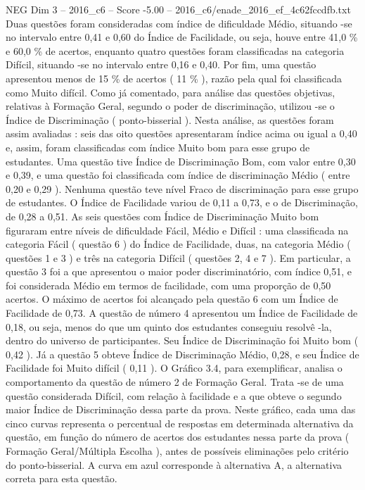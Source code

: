 \begin{textsample}{NEG Dim 3 – 2016\_c6 – Score -5.00 – 2016\_c6/enade\_2016\_ef\_4c62fccdfb.txt}
Duas questões foram consideradas com índice de dificuldade Médio, situando -se no intervalo entre 0,41 e 0,60 do Índice de Facilidade, ou seja, houve entre 41,0 \% e 60,0 \% de acertos, enquanto quatro questões foram classificadas na categoria Difícil, situando -se no intervalo entre 0,16 e 0,40.
Por fim, uma questão apresentou menos de 15 \% de acertos ( 11 \% ), razão pela qual foi classificada como Muito difícil.
Como já comentado, para análise das questões objetivas, relativas à Formação Geral, segundo o poder de discriminação, utilizou -se o Índice de Discriminação ( ponto-bisserial ).
Nesta análise, as questões foram assim avaliadas : seis das oito questões apresentaram índice acima ou igual a 0,40 e, assim, foram classificadas com índice Muito bom para esse grupo de estudantes.
Uma questão tive Índice de Discriminação Bom, com valor entre 0,30 e 0,39, e uma questão foi classificada com índice de discriminação Médio ( entre 0,20 e 0,29 ).
Nenhuma questão teve nível Fraco de discriminação para esse grupo de estudantes.
O Índice de Facilidade variou de 0,11 a 0,73, e o de Discriminação, de 0,28 a 0,51.
As seis questões com Índice de Discriminação Muito bom figuraram entre níveis de dificuldade Fácil, Médio e Difícil : uma classificada na categoria Fácil ( questão 6 ) do Índice de Facilidade, duas, na categoria Médio ( questões 1 e 3 ) e três na categoria Difícil ( questões 2, 4 e 7 ).
Em particular, a questão 3 foi a que apresentou o maior poder discriminatório, com índice 0,51, e foi considerada Médio em termos de facilidade, com uma proporção de 0,50 acertos.
O máximo de acertos foi alcançado pela questão 6 com um Índice de Facilidade de 0,73.
A questão de número 4 apresentou um Índice de Facilidade de 0,18, ou seja, menos do que um quinto dos estudantes conseguiu resolvê -la, dentro do universo de participantes.
Seu Índice de Discriminação foi Muito bom ( 0,42 ).
Já a questão 5 obteve Índice de Discriminação Médio, 0,28, e seu Índice de Facilidade foi Muito difícil ( 0,11 ).
O Gráfico 3.4, para exemplificar, analisa o comportamento da questão de número 2 de Formação Geral.
Trata -se de uma questão considerada Difícil, com relação à facilidade e a que obteve o segundo maior Índice de Discriminação dessa parte da prova.
Neste gráfico, cada uma das cinco curvas representa o percentual de respostas em determinada alternativa da questão, em função do número de acertos dos estudantes nessa parte da prova ( Formação Geral/Múltipla Escolha ), antes de possíveis eliminações pelo critério do ponto-bisserial.
A curva em azul corresponde à alternativa A, a alternativa correta para esta questão.

\end{textsample}
